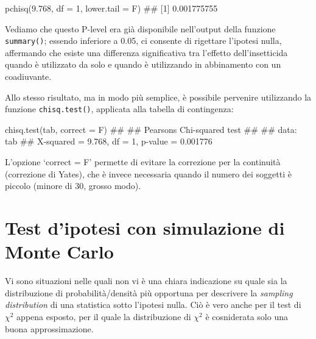 \documentclass[a4paper,12pt,oneside]{book}
\newenvironment{Shaded}{\begin{snugshade}}{\end{snugshade}}
\newcommand{\DecValTok}[1]{#1}
\newcommand{\FloatTok}[1]{#1}
\newcommand{\DocumentationTok}[1]{#1}
\newcommand{\FunctionTok}[1]{#1}
\newcommand{\AttributeTok}[1]{#1}
\newcommand{\NormalTok}[1]{#1}
\begin{document}
\begin{Shaded}
\begin{Highlighting}[]
\FunctionTok{pchisq}\NormalTok{(}\FloatTok{9.768}\NormalTok{, }\AttributeTok{df =} \DecValTok{1}\NormalTok{, }\AttributeTok{lower.tail =}\NormalTok{ F)}
\DocumentationTok{\#\# [1] 0.001775755}
\end{Highlighting}
\end{Shaded}

Vediamo che questo P-level era già disponibile nell'output della funzione \texttt{summary()}; essendo inferiore a 0.05, ci consente di rigettare l'ipotesi nulla, affermando che esiste una differenza significativa tra l'effetto dell'insetticida quando è utilizzato da solo e quando è utilizzando in abbinamento con un coadiuvante.

Allo stesso risultato, ma in modo più semplice, è possibile pervenire utilizzando la funzione \texttt{chisq.test()}, applicata alla tabella di contingenza:

\begin{Shaded}
\begin{Highlighting}[]
\FunctionTok{chisq.test}\NormalTok{(tab, }\AttributeTok{correct =}\NormalTok{ F)}
\DocumentationTok{\#\# }
\DocumentationTok{\#\#  Pearson\textquotesingle{}s Chi{-}squared test}
\DocumentationTok{\#\# }
\DocumentationTok{\#\# data:  tab}
\DocumentationTok{\#\# X{-}squared = 9.768, df = 1, p{-}value = 0.001776}
\end{Highlighting}
\end{Shaded}

L'opzione `correct = F' permette di evitare la correzione per la continuità (correzione di Yates), che è invece necessaria quando il numero dei soggetti è piccolo (minore di 30, grosso modo).

\hypertarget{test-dipotesi-con-simulazione-di-monte-carlo}{%
\section{Test d'ipotesi con simulazione di Monte Carlo}\label{test-dipotesi-con-simulazione-di-monte-carlo}}

Vi sono situazioni nelle quali non vi è una chiara indicazione su quale sia la distribuzione di probabilità/densità più opportuna per descrivere la \emph{sampling distribution} di una statistica sotto l'ipotesi nulla. Ciò è vero anche per il test di \(\chi^2\) appena esposto, per il quale la distribuzione di \(\chi^2\) è cosniderata solo una buona approssimazione.
\end{document}
